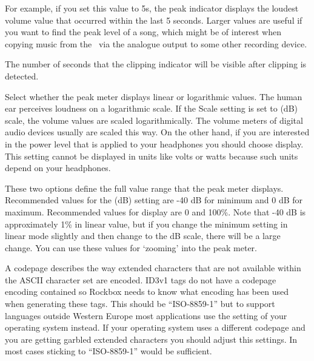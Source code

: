 \begin{description}
{\begin{description}
        For example, if you set this value to 5s, the peak indicator displays
        the loudest volume value that occurred within the last 5 seconds.
        Larger values are useful if you want to find the peak level of a song,
        which might be of interest when copying music from the \dap\ via the
        analogue output to some other recording device.
      \item[Clip Hold Time:]
        The number of seconds that the clipping indicator will be visible
        after clipping is detected.
      \item[\label{ref:Peakmetersetting}Scale:]
        Select whether the peak meter displays linear or logarithmic values.
        The human ear perceives loudness on a logarithmic scale. If the Scale
        setting is set to  (dB) scale, the volume values
        are scaled logarithmically. The volume meters of digital audio
        devices usually are scaled this way. On the other hand, if you
        are interested in the power level that is applied to your headphones
        you should choose  display. This setting cannot be
        displayed in units like volts or watts because such units depend
        on your headphones.
      \item[Minimum and maximum range:]
        These two options define the full value range that the peak meter
        displays. Recommended values for the  (dB) setting
        are {}-40 dB for minimum and 0 dB for maximum. Recommended values
        for  display are 0 and 100\%. Note that {}-40 dB is
        approximately 1\% in linear value, but if you change the minimum
        setting in linear mode slightly and then change to the dB scale,
        there will be a large change. You can use these values for `zooming'
        into the peak meter.
      \end{description}
    }
    \item[Default Codepage:]
      A codepage describes the way extended characters that are not available
      within the ASCII character set are encoded. ID3v1 tags do not have a
      codepage encoding contained so Rockbox needs to know what encoding has
      been used when generating these tags. This should be ``ISO-8859-1'' but
      to support languages outside Western Europe most applications use
      the setting of your operating system instead. If your operating system
      uses a different codepage and you are getting garbled extended characters
      you should adjust this settings. In most cases sticking to
      ``ISO-8859-1'' would be sufficient.
  \end{description}
